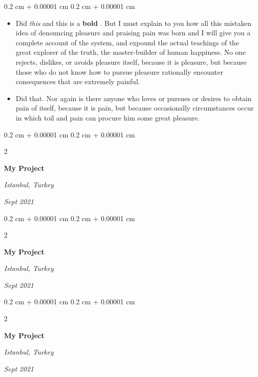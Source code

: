 \documentclass[10pt, letterpaper]{article}
\newenvironment{highlights}{
    \begin{itemize}[
        topsep=0.10 cm,
        parsep=0.10 cm,
        partopsep=0pt,
        itemsep=0pt,
        leftmargin=0.4 cm + 10pt
    ]
}{
    \end{itemize}
} %
\newenvironment{onecolentry}{
    \begin{adjustwidth}{
        0.2 cm + 0.00001 cm
    }{
        0.2 cm + 0.00001 cm
    }
}{
    \end{adjustwidth}
} %
\newenvironment{twocolentry}[2][]{
    \onecolentry
    \def\secondColumn{#2}
    \setcolumnwidth{\fill, 4.5 cm}
    \begin{paracol}{2}
}{
    \switchcolumn \raggedleft \secondColumn
    \end{paracol}
    \endonecolentry
} %
\let\hrefWithoutArrow\href
\renewcommand{\href}[2]{\hrefWithoutArrow{#1}{\ifthenelse{\equal{#2}{}}{ }{#2 }\raisebox{.15ex}{\footnotesize \faExternalLink*}}}
\begin{document}
        \vspace{0.10 cm}
        \begin{onecolentry}
            \begin{highlights}
                \item Did \textit{this} and this is a \textbf{bold} \href{https://example.com}{link}. But I must explain to you how all this mistaken idea of denouncing pleasure and praising pain was born and I will give you a complete account of the system, and expound the actual teachings of the great explorer of the truth, the master-builder of human happiness. No one rejects, dislikes, or avoids pleasure itself, because it is pleasure, but because those who do not know how to pursue pleasure rationally encounter consequences that are extremely painful.
                \item Did that. Nor again is there anyone who loves or pursues or desires to obtain pain of itself, because it is pain, but because occasionally circumstances occur in which toil and pain can procure him some great pleasure.
            \end{highlights}
        \end{onecolentry}


        \vspace{0.2 cm}

        \begin{twocolentry}{
        \textit{Istanbul, Turkey}    
            
        \textit{Sept 2021}}
            \textbf{My Project}
        \end{twocolentry}



        \vspace{0.2 cm}

        \begin{twocolentry}{
        \textit{Istanbul, Turkey}    
            
        \textit{Sept 2021}}
            \textbf{My Project}
        \end{twocolentry}



        \vspace{0.2 cm}

        \begin{twocolentry}{
        \textit{Istanbul, Turkey}    
            
        \textit{Sept 2021}}
            \textbf{My Project}
        \end{twocolentry}
\end{document}
